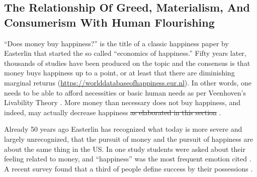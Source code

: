 \documentclass[10pt, letterpaper]{article}
\providecommand{\DIFdeltex}[1]{{\protect\color{red}\sout{#1}}}                      %
\providecommand{\DIFaddbegin}{} %
\providecommand{\DIFaddend}{} %
\providecommand{\DIFdelbegin}{} %
\providecommand{\DIFdelend}{} %
\providecommand{\DIFdel}[1]{\texorpdfstring{\DIFdeltex{#1}}{}} %
\newcommand{\DIFscaledelfig}{0.5}
\newlength{\DIFdelgraphicswidth} %
\newlength{\DIFdelgraphicsheight} %
\newcommand{\DIFaddincludegraphics}[2][]{{\color{blue}\fbox{\DIFOincludegraphics[#1]{#2}}}} %
\newcommand{\DIFdelincludegraphics}[2][]{%
\sbox{\DIFdelgraphicsbox}{\DIFOincludegraphics[#1]{#2}}%
\settoboxwidth{\DIFdelgraphicswidth}{\DIFdelgraphicsbox} %
\settoboxtotalheight{\DIFdelgraphicsheight}{\DIFdelgraphicsbox} %
\scalebox{\DIFscaledelfig}{%
\parbox[b]{\DIFdelgraphicswidth}{\usebox{\DIFdelgraphicsbox}\\[-\baselineskip] \rule{\DIFdelgraphicswidth}{0em}}\llap{\resizebox{\DIFdelgraphicswidth}{\DIFdelgraphicsheight}{%
\setlength{\unitlength}{\DIFdelgraphicswidth}%
\begin{picture}(1,1)%
\thicklines\linethickness{2pt} %
{\color[rgb]{1,0,0}\put(0,0){\framebox(1,1){}}}%
{\color[rgb]{1,0,0}\put(0,0){\line( 1,1){1}}}%
{\color[rgb]{1,0,0}\put(0,1){\line(1,-1){1}}}%
\end{picture}%
}\hspace*{3pt}}} %
} %
\DeclareRobustCommand{\DIFaddbegin}{\DIFOaddbegin \let\includegraphics\DIFaddincludegraphics} %
\DeclareRobustCommand{\DIFaddend}{\DIFOaddend \let\includegraphics\DIFOincludegraphics} %
\DeclareRobustCommand{\DIFdelbegin}{\DIFOdelbegin \let\includegraphics\DIFdelincludegraphics} %
\DeclareRobustCommand{\DIFdelend}{\DIFOaddend \let\includegraphics\DIFOincludegraphics} %
\begin{document}
\begin{spacing}{1.8}
\section{\label{rel}The Relationship Of Greed, Materialism, And Consumerism With  Human Flourishing}


``Does money buy happiness?'' is the title of a classic happiness paper by Easterlin \citeyear{easterlin73} that started the so called ``economics of happiness.'' Fifty
years later, thousands of studies have been produced on the topic and the consensus is that money buys happiness up to a point, or at least that there are diminishing marginal returns (\url{https://worlddatabaseofhappiness.eur.nl}).
%
%
% 
 In other words, one needs to be able to afford necessities or basic human needs as per Veenhoven's Livability Theory \citep{veenhoven14b}. More
 money than necessary does not buy happiness, and indeed, may actually decrease happiness \DIFdelbegin \DIFdel{as elaborated in this section}\DIFdelend %
 .

 Already 50 years ago Easterlin has recognized what today is more severe and
 largely unrecognized, that  the pursuit of money and the pursuit of happiness
 are about the same thing in the US. {In one study students were asked about their feeling related to money, and ``happiness'' was the most frequent emotion cited \citep{mogilner2010pursuit}.
A recent survey found that a third of people define success by their possessions
\citep[cited in][]{joye20}. %
}
 \DIFaddbegin 

\DIFaddend %
%
%
%
%
%


\end{spacing}
\end{document}
